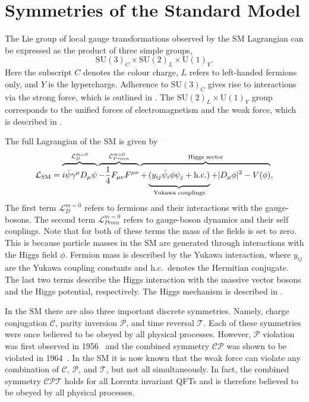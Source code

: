 \section{Symmetries of the Standard Model}
\label{sec:symmetries_of_sm}

The Lie group of local gauge transformations observed by the SM Lagrangian can be expressed as the product of three simple groups,
\begin{equation}
    \label{eq:sm_group}
    \text{SU}(3)_C \times \text{SU}(2)_L \times \text{U}(1)_Y.
\end{equation}
Here the subscript $C$ denotes the colour charge, $L$ refers to left-handed fermions only, and $Y$ is the hypercharge.
Adherence to $\text{SU}(3)_C$ gives rise to interactions via the strong force, which is outlined in .
The $\text{SU}(2)_L \times \text{U}(1)_Y$ group corresponds to the unified forces of electromagnetism and the weak force, which is described in .

The full Lagrangian of the SM is given by
\begin{equation}
    \label{eq:sm_lagrangian}
    \mathcal{L}_\text{SM} =
    \overbrace{
        \vphantom{\frac{1}{4}}
        i \bar \psi \gamma^\mu D_\mu \psi
    }^{\mathcal{L}_{D}^{m=0}
    }
    \overbrace{
        -\frac{1}{4} F_{\mu\nu} F^{\mu\nu}
    }^{\mathcal{L}_{Proca}^{m=0}
    }
    \overbrace{
        +
        \underbrace{
            \vphantom{\frac{1}{4}}
            (y_{ij} \bar \psi_i \phi \psi_j
            + \text{h.c.})
        }_{\text{Yukawa couplings}}
        + |D_\mu \phi|^2
        - V(\phi)
    }^{\text{Higgs sector}},
\end{equation}
The first term $\mathcal{L}_D^{m=0}$ refers to fermions and their interactions with the gauge-bosons.
The second term $\mathcal{L}_{Proca}^{m=0}$ refers to gauge-boson dynamics and their self couplings.
Note that for both of these terms the mass of the fields is set to zero.
This is because particle masses in the SM are generated through interactions with the Higgs field $\phi$.
Fermion mass is described by the Yukawa interaction, where $y_{ij}$ are the Yukawa coupling constants and h.c.\ denotes the Hermitian conjugate.
The last two terms describe the Higgs interaction with the massive vector bosons and the Higgs potential, respectively.
The Higgs mechanism is described in .

In the SM there are also three important discrete symmetries.
Namely, charge conjugation $\mathcal{C}$, parity inversion $\mathcal{P}$, and time reversal $\mathcal{T}$.
Each of these symmetries were once believed to be obeyed by all physical processes.
However, $\mathcal{P}$ violation was first observed in 1956~\cite{Wu1957} and the combined symmetry $\mathcal{CP}$ was shown to be violated in 1964~\cite{CPViolation}.
In the SM it is now known that the weak force can violate any combination of $\mathcal{C}$, $\mathcal{P}$, and $\mathcal{T}$, but not all simultaneously.
In fact, the combined symmetry $\mathcal{CPT}$ holds for all Lorentz invariant QFTs and is therefore believed to be obeyed by all physical processes.

